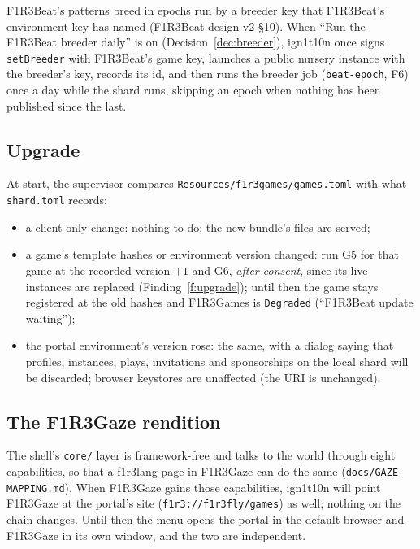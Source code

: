 \documentclass[11pt]{article}
\theoremstyle{definition}
\theoremstyle{remark}
\newcommand{\code}[1]{\texttt{#1}}
\newcommand{\Gz}{F1R3Gaze}
\newcommand{\Hr}{ign1t10n}
\newcommand{\Gm}{F1R3Games}
\begin{document}
F1R3Beat's patterns breed in epochs run by a breeder key that F1R3Beat's environment
key has named (F1R3Beat design v2 \S10). When ``Run the F1R3Beat breeder daily'' is
on (Decision~\ref{dec:breeder}), \Hr{} once signs \code{setBreeder} with F1R3Beat's
game key, launches a public nursery instance with the breeder's key, records its id,
and then runs the breeder job (\code{beat-epoch}, F6) once a day while the shard runs,
skipping an epoch when nothing has been published since the last.

\subsection{Upgrade}\label{sec:gupgrade}

At start, the supervisor compares \code{Resources/f1r3games/games.toml} with what
\code{shard.toml} records:

\begin{itemize}[nosep]
\item a client-only change: nothing to do; the new bundle's files are served;
\item a game's template hashes or environment version changed: run G5 for that game
  at the recorded version $+1$ and G6, \emph{after consent}, since its live instances
  are replaced (Finding~\ref{f:upgrade}); until then the game stays registered at the
  old hashes and \Gm{} is \code{Degraded} (``F1R3Beat update waiting'');
\item the portal environment's version rose: the same, with a dialog saying that
  profiles, instances, plays, invitations and sponsorships on the local shard will be
  discarded; browser keystores are unaffected (the URI is unchanged).
\end{itemize}

\subsection{The \Gz{} rendition}\label{sec:gazerendition}

The shell's \code{core/} layer is framework-free and talks to the world through eight
capabilities, so that a f1r3lang page in \Gz{} can do the same
(\code{docs/GAZE-MAPPING.md}). When \Gz{} gains those capabilities, \Hr{} will point
\Gz{} at the portal's site (\code{f1r3://f1r3fly/games}) as well; nothing on the chain
changes. Until then the menu opens the portal in the default browser and \Gz{} in its
own window, and the two are independent.

\end{document}
